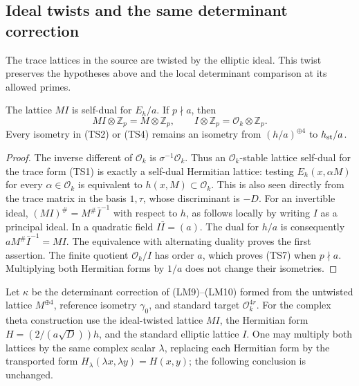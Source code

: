 \subsection{Ideal twists and the same determinant correction}

The trace lattices in the source are twisted by the
elliptic ideal.  This twist preserves the hypotheses
above and the local determinant comparison at its
allowed primes.

\begin{lemma}\label{ts-ideal-twist}
The lattice $MI$ is self-dual for $E_h/a$.
If $p\nmid a$, then
\[
                 MI\otimes\mathbb Z_p=M\otimes\mathbb Z_p,
             \qquad I\otimes\mathbb Z_p
                         =\mathcal O_k\otimes\mathbb Z_p.
 \tag{TS7}
\]
Every isometry in (TS2) or (TS4) remains an isometry
from $(h/a)^{\oplus4}$ to $h_{\rm st}/a$.
\end{lemma}
\begin{proof}
The inverse different of $\mathcal O_k$ is
$\sigma^{-1}\mathcal O_k$.
Thus an $\mathcal O_k$-stable lattice self-dual for
the trace form (TS1) is exactly a self-dual Hermitian
lattice: testing $E_h(x,\alpha M)$ for every
$\alpha\in\mathcal O_k$ is equivalent to
$h(x,M)\subset\mathcal O_k$.
This is also seen directly from the trace matrix in
the basis $1,\tau$, whose discriminant is $-D$.
For an invertible ideal,
$(MI)^\#=M^\#\bar I^{-1}$ with respect to $h$,
as follows locally by writing $I$ as a principal ideal.
In a quadratic field $I\bar I=(a)$.
The dual for $h/a$ is consequently
$aM^\#\bar I^{-1}=MI$.
The equivalence with alternating duality proves the
first assertion.
The finite quotient $\mathcal O_k/I$ has order $a$,
which proves (TS7) when $p\nmid a$.
Multiplying both Hermitian forms by $1/a$ does not
change their isometries.
\end{proof}

Let $\kappa$ be the determinant correction of (LM9)--(LM10)
formed from the untwisted lattice $M^{\oplus4}$, reference
isometry $\gamma_0$, and standard target $\mathcal O_k^{4r}$.
For the complex theta construction use the ideal-twisted
lattice $MI$, the Hermitian form $H=(2/(a\sqrt D))h$,
and the standard elliptic lattice $I$.
One may multiply both lattices by the same complex scalar
$\lambda$, replacing each Hermitian form by the transported
form $H_\lambda(\lambda x,\lambda y)=H(x,y)$;
the following conclusion is unchanged.

